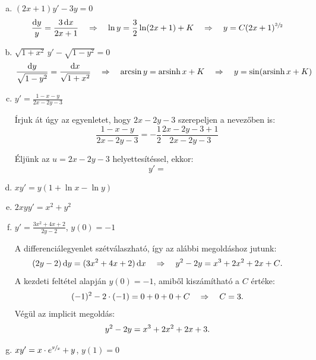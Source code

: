 \documentclass{szb-solution}
\begin{document}
\begin{enumerate}[a)]
  \item $(2x + 1) y' - 3y = 0$
        $$
          \frac{\mathop{}\!\mathrm{d} y}{y} = \frac{3 \mathop{}\!\mathrm{d} x}{2x + 1}
          \quad \Rightarrow \quad
          \ln y = \frac{3}{2} \ln(2x + 1) + K
          \quad \Rightarrow \quad
          y = C (2x + 1)^{\sfrac{3}{2}}
        $$


  \item $\displaystyle\sqrt{1 + x^2} \, y' - \sqrt{1 - y^2} = 0$
        $$
          \frac{\mathop{}\!\mathrm{d} y}{\sqrt{1 - y^2}} = \frac{\mathop{}\!\mathrm{d} x}{\sqrt{1 + x^2}}
          \quad \Rightarrow \quad
          \arcsin y = \operatorname{arsinh} x + K
          \quad \Rightarrow \quad
          y = \sin(\operatorname{arsinh} x + K)
        $$

  \item $y' = \frac{1 - x - y}{2x - 2y - 3}$

        Írjuk át úgy az egyenletet, hogy $2x - 2y -3$ szerepeljen a nevezőben
        is:
        $$
          \frac{1 - x - y}{2x - 2y - 3}
          = -\frac12 \frac{2x -2y - 3 + 1}{2x - 2y - 3}
        $$

        Éljünk az $u = 2x - 2y - 3$ helyettesítéssel, ekkor:
        $$
          y' =
        $$

  \item $xy' = y(1 + \ln x - \ln y)$
  \item $2xyy' = x^2 + y^2$

  \item $y' = \frac{3x^2 + 4x + 2}{2y - 2}$, \quad $y(0) = -1$

        A differenciálegyenlet szétválaszható, így az alábbi megoldáshoz jutunk:
        $$
          (2y - 2) \mathop{}\!\mathrm{d} y = (3x^2 + 4x + 2) \mathop{}\!\mathrm{d} x
          \quad \Rightarrow \quad
          y^2 - 2y = x^3 + 2x^2 + 2x + C
          \text.
        $$
        A kezdeti feltétel alapján $y(0) = -1$, amiből kiszámítható a $C$ értéke:
        $$
          (-1)^2 - 2 \cdot (-1) = 0 + 0 + 0 + C
          \quad \Rightarrow \quad
          C = 3
          \text.
        $$
        Végül az implicit megoldás:
        $$
          y^2 - 2y = x^3 + 2x^2 + 2x + 3
          \text.
        $$

  \item $xy' = x \cdot e^{\sfrac{y}{x}} + y$, \quad $y(1) = 0$


\end{enumerate}
\end{document}
